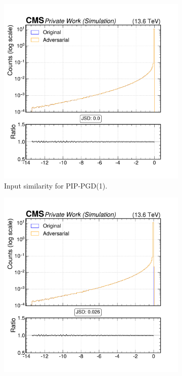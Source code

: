 \begin{figure}[htbp]
  \centering
  \begin{subfigure}[t]{0.32\textwidth}
    \includegraphics[width=\linewidth]{media/output/features/compare/combined_it_1/cmp_cpf_arr_Cpfcan_BtagPf_trackJetDistVal.pdf}
    \caption*{Input similarity for PIP-PGD(1).}
  \end{subfigure}\hfill
  \begin{subfigure}[t]{0.32\textwidth}
    \includegraphics[width=\linewidth]{media/output/features/compare/combined_it_2/cmp_cpf_arr_Cpfcan_BtagPf_trackJetDistVal.pdf}

\end{subfigure}
\end{figure}
